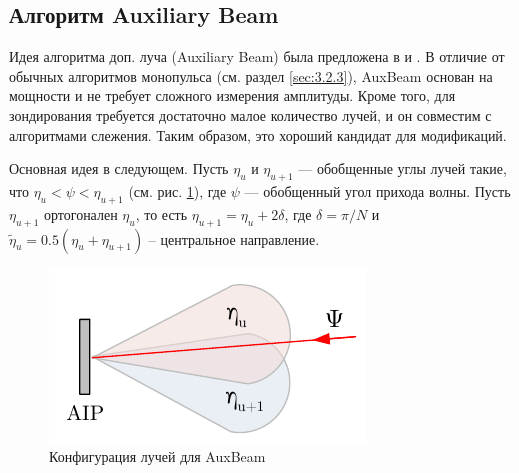 \subsection{Алгоритм Auxiliary Beam}
Идея алгоритма доп. луча (Auxiliary Beam) была предложена в \cite{Zhu2016} и \cite{Kim2019}. В отличие от
обычных алгоритмов монопульса (см. раздел \ref{sec:3.2.3}), AuxBeam основан на
мощности и не требует сложного измерения амплитуды. Кроме того, для зондирования
требуется достаточно малое количество лучей, и он совместим с алгоритмами
слежения. Таким образом, это хороший кандидат для модификаций.

Основная идея в следующем. Пусть $\eta_u$ и $\eta_{u+1}$ — обобщенные углы лучей такие, что
$\eta_u<\psi<\eta_{u+1}$ (см. рис. \ref{fig:4.14}), где $\psi$ — обобщенный угол прихода волны.
Пусть $\eta_{u+1}$ ортогонален $\eta_u$, то есть $\eta_{u+1} = \eta_u + 2\delta$, где $\delta = \pi/N$  и
$\tilde \eta_u = 0.5 (\eta_u + \eta_{u+1})$ -- центральное направление.
\begin{figure}[ht]
    \centering
    \includegraphics[width=0.5\linewidth]{figs/fig4.14}
    \caption{Конфигурация лучей для AuxBeam}
    \label{fig:4.14}
\end{figure}

